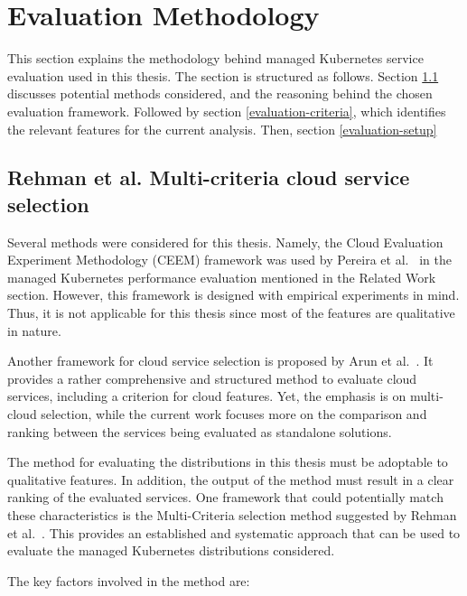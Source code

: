 \chapter{Evaluation Methodology}\label{evaluation-methodology}

This section explains the methodology behind managed Kubernetes service evaluation used in this thesis. The section is structured as follows. Section \ref{feature-evaluation} discusses potential methods considered, and the reasoning behind the chosen evaluation framework. Followed by section \ref{evaluation-criteria}, which identifies the relevant features for the current analysis. Then, section \ref{evaluation-setup} 

\section{Rehman et al. Multi-criteria cloud service selection}\label{feature-evaluation}

Several methods were considered for this thesis. Namely, the Cloud
Evaluation Experiment Methodology (CEEM) framework was used by Pereira
et al.~\cite{pereiraferreiraPerformanceEvaluationContainers2019} in the
managed Kubernetes performance evaluation mentioned in the Related Work
section. However, this framework is designed with empirical experiments
in mind. Thus, it is not applicable for this thesis since most of the
features are qualitative in nature.

Another framework for cloud service selection is proposed by Arun et
al.~\cite{9284492}. It provides a rather comprehensive and structured
method to evaluate cloud services, including a criterion for cloud
features. Yet, the emphasis is on multi-cloud selection, while the
current work focuses more on the comparison and ranking between the
services being evaluated as standalone solutions.

The method for evaluating the distributions in this thesis must be
adoptable to qualitative features. In addition, the output of the method
must result in a clear ranking of the evaluated services. One framework
that could potentially match these characteristics is the Multi-Criteria
selection method suggested by Rehman et al.~\cite{5976164}. This
provides an established and systematic approach that can be used to
evaluate the managed Kubernetes distributions considered.

The key factors involved in the method are:

